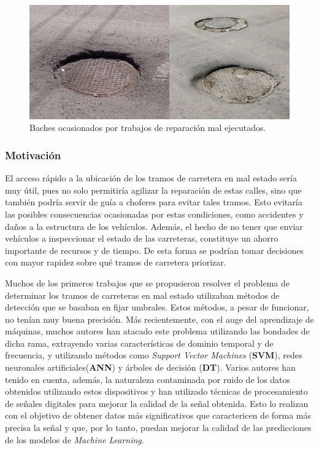 \begin{figure}[htb]
	\centering
	\includegraphics[scale=0.45]{Graphics/pothole_due_to_bad_job_1}
	\caption{Baches ocasionados por trabajos de reparación mal ejecutados.}
	\label{fig:1}
\end{figure}
	
	\subsubsection*{Motivación}
		El acceso rápido a la ubicación de los tramos de carretera en mal estado sería muy útil, pues no solo permitiría agilizar la
		reparación de estas calles, sino que también podría servir de guía a choferes para evitar tales tramos. Esto evitaría las posibles
		consecuencias ocasionadas por estas condiciones, como accidentes y daños a la estructura de los vehículos. Además, el hecho de no tener que
		enviar vehículos a inspeccionar el estado de las carreteras, constituye un ahorro importante de recursos y de tiempo. De esta forma se podrían
		tomar decisiones con mayor rapidez sobre qué tramos de carretera priorizar.
		
		Muchos de los primeros trabajos que se propusieron resolver el problema de determinar los tramos de carreteras en mal estado utilizaban
		métodos de detección que se basaban en fijar umbrales. Estos métodos, a pesar de funcionar, no tenían muy buena precisión. Más recientemente, con el auge del aprendizaje de máquinas, muchos autores han atacado este problema utilizando
		las bondades de dicha rama, extrayendo varias características de dominio temporal y de frecuencia, y utilizando métodos como \emph{Support Vector
		Machines} (\textbf{SVM}), redes neuronales artificiales(\textbf{ANN}) y árboles de decisión (\textbf{DT}). Varios autores han tenido en cuenta, además, la naturaleza contaminada por ruido de
		los datos obtenidos utilizando estos dispositivos y han utilizado técnicas de procesamiento de señales digitales para mejorar la calidad de la señal
		obtenida.  Esto lo realizan con el objetivo de obtener datos más significativos que caractericen de forma más precisa la señal y que, por lo tanto, puedan mejorar
		la calidad de las predicciones de los modelos de \emph{Machine Learning}.\\
		
